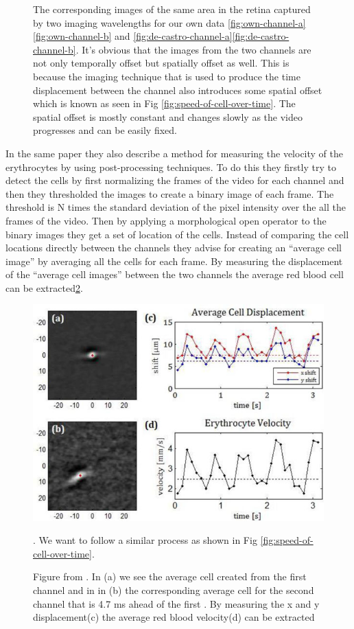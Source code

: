 \documentclass[]{article}
\begin{document}
\begin{figure}[ht]
	\caption{The corresponding images of the same area in the retina captured by two imaging
		wavelengths for our own data \ref{fig:own-channel-a}\ref{fig:own-channel-b} and \ref{fig:de-castro-channel-a}\ref{fig:de-castro-channel-b}.
		It's obvious that the images from the two channels are not only temporally offset but
		spatially offset as well.
		This is because the imaging technique that is used to produce the time displacement between the channel also introduces some spatial offset which is known as seen in Fig \ref{fig:speed-of-cell-over-time}.
		The spatial offset is mostly constant and changes slowly as the video progresses and 
		can be easily fixed. 
	}
	\label{fig:corresponding-channels}
\end{figure}

In the same paper they also describe a method for measuring the velocity of the erythrocytes by using post-processing techniques.
To do this they firstly try to detect the cells by first normalizing the frames of the video for each channel and then they thresholded the images to create a binary image of each frame.
The threshold is N times the standard deviation of the pixel intensity over the all the frames 
of the video.
Then by applying a morphological open operator to the binary images they get a set of location of the cells.
Instead of comparing the cell locations directly between the channels they advise for creating an ``average cell image'' by averaging all the cells for each frame.
By measuring the displacement of the ``average cell images'' between the two channels the average red blood cell can be extracted\ref{fig:castro-average-cell}.

\begin{figure}[ht]
 	\centering
 	\includegraphics[width=0.5\textheight]{castro-average-cell.png}
 	\caption{Figure from \cite{castro_rapid_2016}.
 		In (a) we see the average cell created from the first channel and in
 		in (b) the corresponding average cell for the second channel that is 4.7 ms ahead
 		of the first . By measuring the 
 		x and y displacement(c) the average red blood velocity(d) can be extracted}.
 	 	We want to follow a similar process as shown in Fig \ref{fig:speed-of-cell-over-time}.
 	\label{fig:castro-average-cell}
\end{figure}
\end{document}
